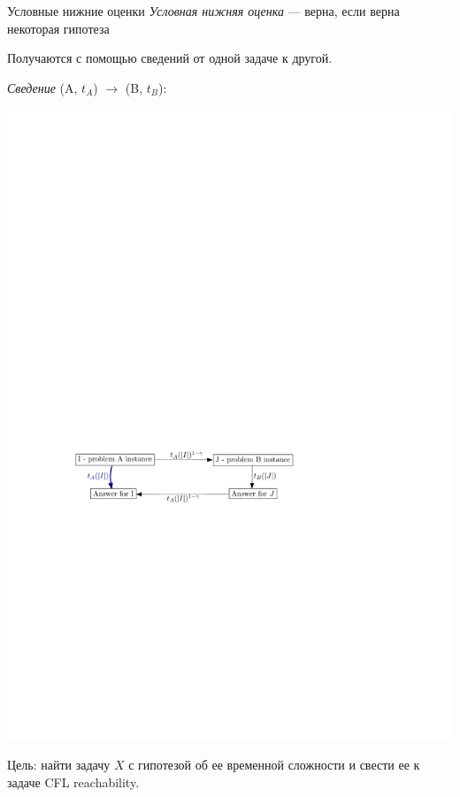 \documentclass{beamer}
\begin{document}
\begin{frame}{Условные нижние оценки}
	\textit{Условная нижняя оценка} --- верна, если верна некоторая гипотеза
	
	Получаются с помощью сведений от одной задаче к другой. 
	
	\vspace{1cm}
	
	\textit{Сведение} (A, $t_A$) $\rightarrow$ (B, $t_B$):
	
	\begin{center}
		\includegraphics[scale=0.85]{./pictures/reduction.pdf}
	\end{center}

	Цель: найти задачу $X$ с гипотезой об ее временной сложности и свести ее к задаче CFL reachability. 
\end{frame}
\end{document}

